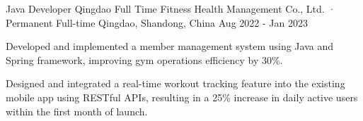 \begin{cventries}
  \vspace{5mm}

  \cventry
  {Java Developer} %
  {Qingdao Full Time Fitness Health Management Co., Ltd. · Permanent Full-time} %
  {Qingdao, Shandong, China} %
  {Aug 2022 - Jan 2023} %
  {
    \begin{cvitems} %
      \item {Developed and implemented a member management system using Java and Spring framework, improving gym operations efficiency by 30\%.}
      \item {Designed and integrated a real-time workout tracking feature into the existing mobile app using RESTful APIs, resulting in a 25\% increase in daily active users within the first month of launch.}
    \end{cvitems}
  }
\end{cventries}
